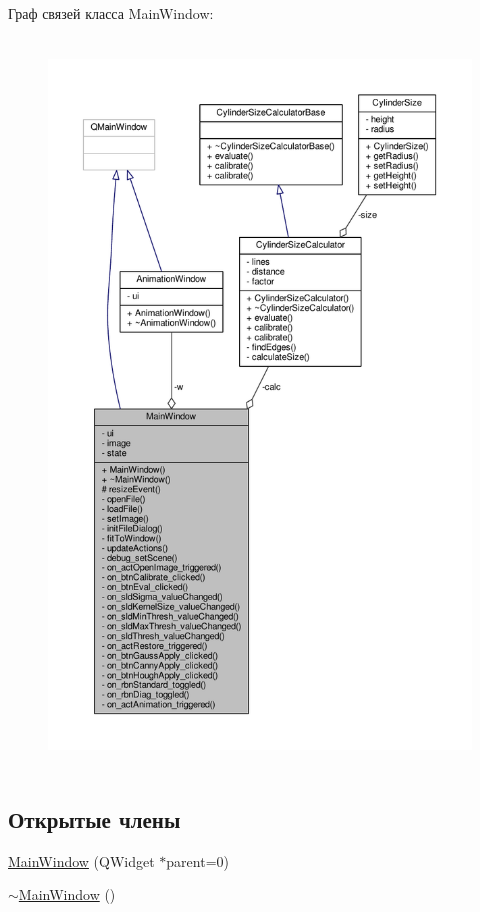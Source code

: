 Граф связей класса Main\+Window\+:
\nopagebreak
\begin{figure}[H]
\begin{center}
\leavevmode
\includegraphics[height=550pt]{d0/db8/class_main_window__coll__graph}
\end{center}
\end{figure}
\subsection*{Открытые члены}
\begin{DoxyCompactItemize}
\item 
\hyperlink{class_main_window_a8b244be8b7b7db1b08de2a2acb9409db}{Main\+Window} (Q\+Widget $\ast$parent=0)
\item 
\hyperlink{class_main_window_ae98d00a93bc118200eeef9f9bba1dba7}{$\sim$\+Main\+Window} ()
\end{DoxyCompactItemize}
